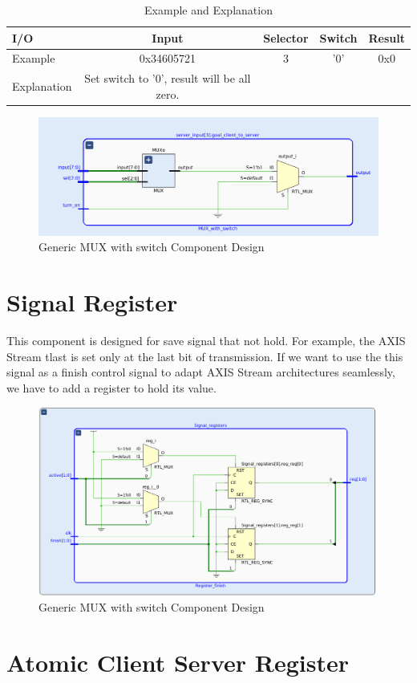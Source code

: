 \begin{table}[htb]
	\centering
	\caption{Example and Explanation }
	\begin{tabular}{l c c c c}
		\toprule
		I/O  &  Input  & Selector & Switch & Result \\ \midrule
		Example  &  0x34605721 & 3 & '0' & 0x0\\
		Explanation  & Set switch to '0', result will be all zero.\\
		\bottomrule
	\end{tabular}
	\label{tab:muxpp}
\end{table}		
	
\begin{figure}[htb]
	\centering
	\includegraphics[width=.5\linewidth]{figures/mux-w-s.png}
	\caption{Generic MUX with switch Component Design}
	\label{fig:muxpp}
\end{figure}
\section{Signal Register}
 
	This component is designed for save signal that not hold. For example, the AXIS Stream tlast is set only at the last bit of transmission. If we want to use the this signal as a finish control signal to adapt AXIS Stream architectures seamlessly, we have to add a register to hold its value.
\begin{figure}[htb]
	\centering
	\includegraphics[width=.8\linewidth]{figures/Signal-reg.png}
	\caption{Generic MUX with switch Component Design}
	\label{fig:sigreg}
\end{figure}	

\section{Atomic Client Server Register}

